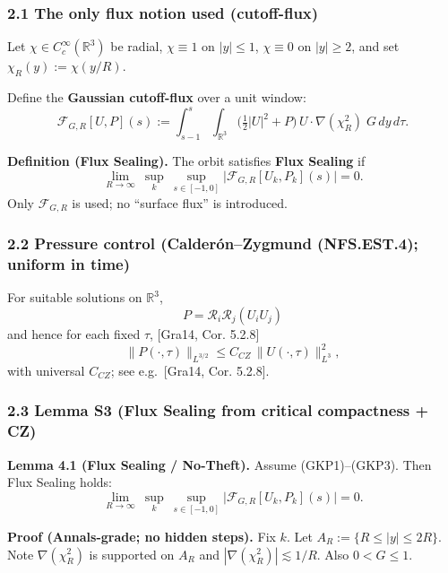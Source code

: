 \documentclass[
  11pt,
]{article}
\begin{document}
\hypertarget{the-only-flux-notion-used-cutoff-flux}{%
\subsubsection{2.1 The only flux notion used (cutoff-flux)}\label{the-only-flux-notion-used-cutoff-flux}}

Let \(\chi\in C_c^\infty(\mathbb{R}^3)\) be radial, \(\chi\equiv 1\) on \(|y|\le 1\), \(\chi\equiv 0\) on \(|y|\ge 2\), and set \(\chi_R(y):=\chi(y/R)\).

Define the \textbf{Gaussian cutoff-flux} over a unit window: \[
\mathcal{F}_{G,R}[U,P](s)
:=\int_{s-1}^{s}\int_{\mathbb{R}^3}
\Big(\tfrac12 |U|^2 + P\Big)\,U\cdot\nabla(\chi_R^2)\; G\,dy\,d\tau.
\]

\textbf{Definition (Flux Sealing).} The orbit satisfies \textbf{Flux Sealing} if \[
\lim_{R\to\infty}\ \sup_k\ \sup_{s\in[-1,0]}\big|\mathcal{F}_{G,R}[U_k,P_k](s)\big|=0.
\] Only \(\mathcal{F}_{G,R}\) is used; no ``surface flux'' is introduced.

\hypertarget{pressure-control-calderuxf3nzygmund-nfs.est.4-uniform-in-time}{%
\subsubsection{2.2 Pressure control (Calderón--Zygmund (NFS.EST.4); uniform in time)}\label{pressure-control-calderuxf3nzygmund-nfs.est.4-uniform-in-time}}

For suitable solutions on \(\mathbb R^3\), \[
P = \mathcal{R}_i\mathcal{R}_j(U_iU_j)
\] and hence for each fixed \(\tau\), {[}Gra14, Cor. 5.2.8{]} \[
\|P(\cdot,\tau)\|_{L^{3/2}} \le C_{CZ}\,\|U(\cdot,\tau)\|_{L^3}^2,
\] with universal \(C_{CZ}\); see e.g.~{[}Gra14, Cor. 5.2.8{]}.

\hypertarget{lemma-s3-flux-sealing-from-critical-compactness-cz}{%
\subsubsection{2.3 Lemma S3 (Flux Sealing from critical compactness + CZ)}\label{lemma-s3-flux-sealing-from-critical-compactness-cz}}

\textbf{Lemma 4.1 (Flux Sealing / No-Theft).} Assume (GKP1)--(GKP3). Then Flux Sealing holds: \[
\lim_{R\to\infty}\ \sup_k\ \sup_{s\in[-1,0]}\big|\mathcal{F}_{G,R}[U_k,P_k](s)\big|=0.
\]

\textbf{Proof (Annals-grade; no hidden steps).} Fix \(k\). Let \(A_R:=\{R\le |y|\le 2R\}\). Note \(\nabla(\chi_R^2)\) is supported on \(A_R\) and \(|\nabla(\chi_R^2)|\lesssim 1/R\). Also \(0<G\le 1\).
\end{document}
